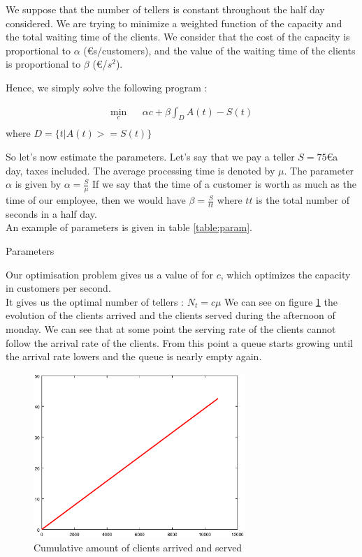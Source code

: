\documentclass[12pt,a4paper,notitlepage]{report}
\begin{document}
We suppose that the number of tellers is constant throughout the half day considered.
We are trying to minimize a weighted function of the capacity and the total waiting time of the clients.
We consider that the cost of the capacity is proportional to $ \alpha$ (\euro s/customers), and the value of the waiting time of the clients is proportional to $\beta$ (\euro/$s^2$).

Hence, we simply solve the following program :

\begin{eqnarray*}
\min_c & & \alpha c + \beta \int_D A(t)-S(t)\\
\end{eqnarray*}
where $D = \{t | A(t)>=S(t) \}$

So let's now estimate the parameters. Let's say that we pay a teller $S = 75$\euro a day, taxes included.
The average processing time is denoted by $\mu$. 
The parameter $\alpha$ is given by $\alpha = \frac{S}{\mu}$
If we say that the time of a customer is worth as much as the time of our employee, then we would have $\beta = \frac{S}{tt}$ where $tt$ is the total number of seconds in a half day.\\
An example of parameters is given in table \ref{table:param}.
\begin{table}

\caption{Parameters\label{table:param}}
\end{table}

Our optimisation problem gives us a value of  for $c$, which optimizes the capacity in customers per second.\\
It gives us the optimal number of tellers : $N_t = c \mu$
We can see on figure \ref{fig:clients_lun} the evolution of the clients arrived and the clients served during the afternoon of monday. We can see that at some point the serving rate of the clients cannot follow the arrival rate of the clients. From this point a queue starts growing until the arrival rate lowers and the queue is nearly empty again.
\begin{figure}[h]
\centering
\includegraphics[width = 8cm]{half_day_test_clients_served.eps}
\caption{Cumulative amount of clients arrived and served\label{fig:clients_lun}}
\end{figure}
\end{document}
